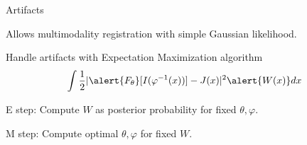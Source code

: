 \documentclass{beamer}
\newcommand\blfootnote[1]{%
  \begingroup
  \renewcommand\thefootnote{}\footnote{#1}%
  \addtocounter{footnote}{-1}%
  \endgroup
}
\begin{document}
\begin{frame}{Artifacts}

Allows multimodality registration with simple Gaussian likelihood.


Handle artifacts with Expectation Maximization algorithm
\begin{align*}
\int \frac12 |\alert{F_\theta} [I(\varphi^{-1}(x))] - J(x)|^2\alert{W(x)} dx
\end{align*}

\alert{E step}: Compute $W$ as posterior probability for fixed $\theta,\varphi$.

\alert{M step}: Compute optimal $\theta,\varphi$ for fixed $W$.




\centering
{}~
\end{frame}
\end{document}
